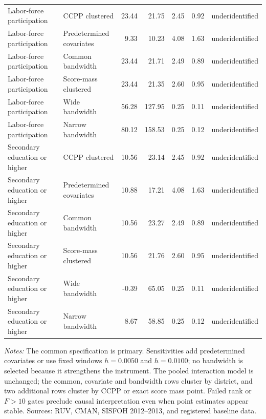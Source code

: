 \begin{table}[!htbp]
{\begin{tabular}{llrrrrl}
Labor-force participation & CCPP clustered & 23.44 & 21.75 & 2.45 & 0.92 & underidentified \\
Labor-force participation & Predetermined covariates & 9.33 & 10.23 & 4.08 & 1.63 & underidentified \\
Labor-force participation & Common bandwidth & 23.44 & 21.71 & 2.49 & 0.89 & underidentified \\
Labor-force participation & Score-mass clustered & 23.44 & 21.35 & 2.60 & 0.95 & underidentified \\
Labor-force participation & Wide bandwidth & 56.28 & 127.95 & 0.25 & 0.11 & underidentified \\
Labor-force participation & Narrow bandwidth & 80.12 & 158.53 & 0.25 & 0.12 & underidentified \\
Secondary education or higher & CCPP clustered & 10.56 & 23.14 & 2.45 & 0.92 & underidentified \\
Secondary education or higher & Predetermined covariates & 10.88 & 17.21 & 4.08 & 1.63 & underidentified \\
Secondary education or higher & Common bandwidth & 10.56 & 23.27 & 2.49 & 0.89 & underidentified \\
Secondary education or higher & Score-mass clustered & 10.56 & 21.76 & 2.60 & 0.95 & underidentified \\
Secondary education or higher & Wide bandwidth & -0.39 & 65.05 & 0.25 & 0.11 & underidentified \\
Secondary education or higher & Narrow bandwidth & 8.67 & 58.85 & 0.25 & 0.12 & underidentified \\
\bottomrule
\end{tabular}}
\parbox{0.97\linewidth}{\scriptsize \textit{Notes:} The common specification is primary. Sensitivities add predetermined covariates or use fixed windows \(h=0.0050\) and \(h=0.0100\); no bandwidth is selected because it strengthens the instrument. The pooled interaction model is unchanged; the common, covariate and bandwidth rows cluster by district, and two additional rows cluster by CCPP or exact score mass point. Failed rank or \(F>10\) gates preclude causal interpretation even when point estimates appear stable. Sources: RUV, CMAN, SISFOH 2012--2013, and registered baseline data.}
\end{table}
